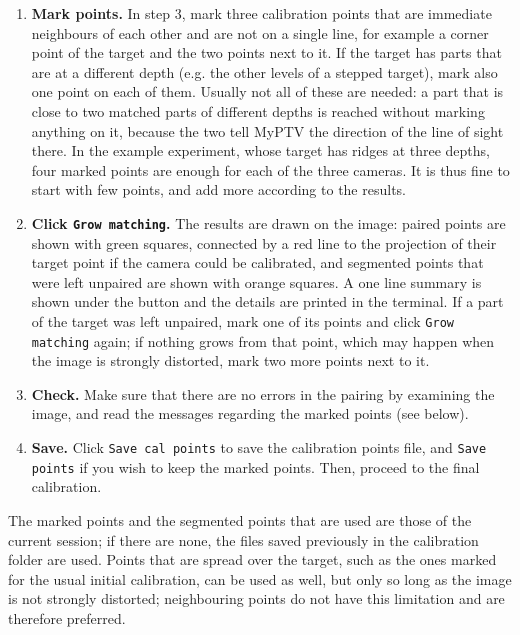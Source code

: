 \documentclass[10pt,a4paper]{article}
\begin{document}
\begin{enumerate}
	\item \textbf{Mark points.} In step 3, mark three calibration points that are immediate neighbours of each other and are not on a single line, for example a corner point of the target and the two points next to it. If the target has parts that are at a different depth (e.g. the other levels of a stepped target), mark also one point on each of them. Usually not all of these are needed: a part that is close to two matched parts of different depths is reached without marking anything on it, because the two tell MyPTV the direction of the line of sight there. In the example experiment, whose target has ridges at three depths, four marked points are enough for each of the three cameras. It is thus fine to start with few points, and add more according to the results.
	
	\item \textbf{Click \texttt{Grow matching}.} The results are drawn on the image: paired points are shown with green squares, connected by a red line to the projection of their target point if the camera could be calibrated, and segmented points that were left unpaired are shown with orange squares. A one line summary is shown under the button and the details are printed in the terminal. If a part of the target was left unpaired, mark one of its points and click \texttt{Grow matching} again; if nothing grows from that point, which may happen when the image is strongly distorted, mark two more points next to it. 
	
	\item \textbf{Check.} Make sure that there are no errors in the pairing by examining the image, and read the messages regarding the marked points (see below).
	
	\item \textbf{Save.} Click \texttt{Save cal points} to save the calibration points file, and \texttt{Save points} if you wish to keep the marked points. Then, proceed to the final calibration.
\end{enumerate}

The marked points and the segmented points that are used are those of the current session; if there are none, the files saved previously in the calibration folder are used. Points that are spread over the target, such as the ones marked for the usual initial calibration, can be used as well, but only so long as the image is not strongly distorted; neighbouring points do not have this limitation and are therefore preferred.
\end{document}
